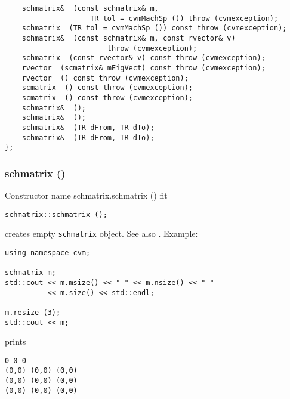 \verb"    schmatrix& "\verb" (const schmatrix& m,"\\
\verb"                    TR tol = cvmMachSp ()) throw (cvmexception);"\\
\verb"    schmatrix "\verb" (TR tol = cvmMachSp ()) const throw (cvmexception);"\\
\verb"    schmatrix& "\verb" (const schmatrix& m, const rvector& v)"\\
\verb"                        throw (cvmexception);"\\
\verb"    schmatrix "\verb" (const rvector& v) const throw (cvmexception);"\\
\verb"    rvector "\verb" (scmatrix& mEigVect) const throw (cvmexception);"\\
\verb"    rvector "\verb" () const throw (cvmexception);"\\
\verb"    scmatrix "\verb" () const throw (cvmexception);"\\
\verb"    scmatrix "\verb" () const throw (cvmexception);"\\
\verb"    schmatrix& "\verb" ();"\\
\verb"    schmatrix& "\verb" ();"\\
\verb"    schmatrix& "\verb" (TR dFrom, TR dTo);"\\
\verb"    schmatrix& "\verb" (TR dFrom, TR dTo);"\\
\verb"};"
\newpage


\subsubsection{schmatrix ()}
Constructor%
\pdfdest name {schmatrix.schmatrix ()} fit
\begin{verbatim}
schmatrix::schmatrix ();
\end{verbatim}
creates  empty \verb"schmatrix" object.
See also .
Example:
\begin{Verbatim}
using namespace cvm;

schmatrix m;
std::cout << m.msize() << " " << m.nsize() << " " 
          << m.size() << std::endl;

m.resize (3);
std::cout << m;
\end{Verbatim}
prints
\begin{Verbatim}
0 0 0
(0,0) (0,0) (0,0)
(0,0) (0,0) (0,0)
(0,0) (0,0) (0,0)
\end{Verbatim}
\newpage



